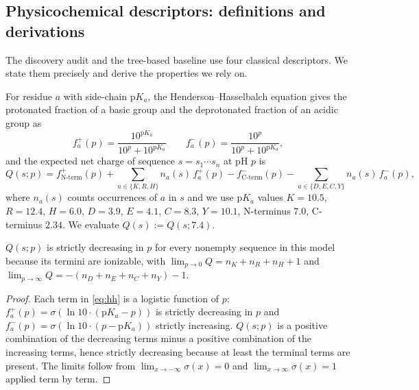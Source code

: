 \subsection{Physicochemical descriptors: definitions and derivations}
\label{sec:physchem-math}

The discovery audit and the tree-based baseline use four classical
descriptors. We state them precisely and derive the properties we rely on.

\begin{definition}
For residue $a$ with side-chain $\mathrm{p}K_a$, the Henderson--Hasselbalch
equation gives the protonated fraction of a basic group and the
deprotonated fraction of an acidic group as
\begin{equation}
f^{+}_a(p) = \frac{10^{\mathrm{p}K_a}}{10^{p} + 10^{\mathrm{p}K_a}}
\qquad
f^{-}_a(p) = \frac{10^{p}}{10^{p} + 10^{\mathrm{p}K_a}},
\label{eq:hh}
\end{equation}
and the expected net charge of sequence $s = s_1\cdots s_n$ at pH $p$ is
\begin{equation}
Q(s; p) = f^{+}_{\mathrm{N\text{-}term}}(p)
  + \!\!\sum_{a \in \{K,R,H\}}\!\! n_a(s)\, f^{+}_a(p)
  - f^{-}_{\mathrm{C\text{-}term}}(p)
  - \!\!\sum_{a \in \{D,E,C,Y\}}\!\! n_a(s)\, f^{-}_a(p),
\label{eq:netcharge}
\end{equation}
where $n_a(s)$ counts occurrences of $a$ in $s$ and we use
$\mathrm{p}K_a$ values $K{=}10.5$, $R{=}12.4$, $H{=}6.0$, $D{=}3.9$,
$E{=}4.1$, $C{=}8.3$, $Y{=}10.1$, N-terminus $7.0$, C-terminus $2.34$.
We evaluate $Q(s) := Q(s; 7.4)$.
\end{definition}

\begin{proposition}
\label{prop:charge-monotone}
$Q(s; p)$ is strictly decreasing in $p$ for every nonempty
sequence in this model because its termini are ionizable, with $\lim_{p\to 0} Q = n_K + n_R + n_H + 1$ and
$\lim_{p\to\infty} Q = -(n_D + n_E + n_C + n_Y) - 1$.
\end{proposition}
\begin{proof}
Each term in \eqref{eq:hh} is a logistic function of $p$:
$f^{+}_a(p) = \sigma(\ln 10 \cdot (\mathrm{p}K_a - p))$ is strictly
decreasing in $p$ and $f^{-}_a(p) = \sigma(\ln 10 \cdot (p - \mathrm{p}K_a))$
strictly increasing. $Q(s;p)$ is a positive combination of the decreasing
terms minus a positive combination of the increasing terms, hence strictly decreasing because at least the terminal terms are present. The limits follow
from $\lim_{x\to-\infty}\sigma(x) = 0$ and $\lim_{x\to\infty}\sigma(x) = 1$
applied term by term.
\end{proof}

